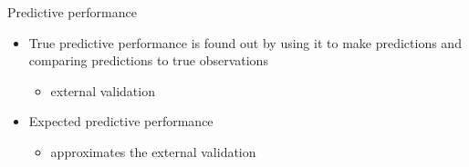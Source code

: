 \documentclass[english,t]{beamer}
\newenvironment{list1}{
   \begin{list}{$\color{list1}\bullet$}{\itemsep=6pt}}{
  \end{list}}
\newenvironment{list2}{
  \begin{list}{-}{\baselineskip=12pt\itemsep=2pt}}{
  \end{list}}
\begin{document}

  

\begin{frame}{Predictive performance}

  \begin{itemize}
  \item<1-> True predictive performance is found out by using it to make
    predictions and comparing predictions to true observations
    \begin{itemize}
      \item external validation
    \end{itemize}
  \item<2-> Expected predictive performance
    \begin{itemize}
      \item approximates the external validation
      \end{itemize}
    \end{itemize}

\end{frame}



  
\end{document}
